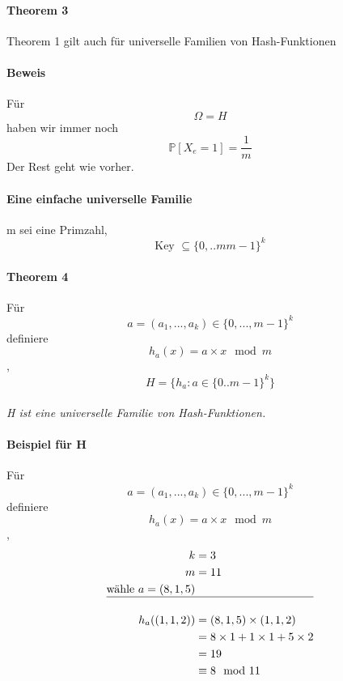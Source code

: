 \documentclass[a4paper]{scrartcl}
\begin{document}
	 	\paragraph{Theorem 3}
	 	Theorem 1 gilt auch für universelle Familien von Hash-Funktionen
	 	
	 	\paragraph{Beweis}
	 	Für \[ \Omega = H \]
	 	haben wir immer noch 
	 	\[ \mathbb{P}[X_e = 1] = \frac{1}{m} \]
	 	Der Rest geht wie vorher.
	 	
	 \paragraph{Eine einfache universelle Familie}
	 m sei eine Primzahl, 
	 \[ \text{Key } \subseteq \{ 0,..m m - 1 \}^k  \]
	 
	 \paragraph{Theorem 4}
	 Für \[ a = (a_1,..., a_k) \in \{0,..., m-1\}^k  \]
	 definiere \[h_a(x) = a \times x \mod m \],
	 \[ H = \{h_a : a \in \{ 0.. m-1 \}^k \} \]\\
	 \emph{H ist eine universelle Familie von Hash-Funktionen.}
	 
	 \paragraph{Beispiel für H}
	 Für \[ a = (a_1,..., a_k) \in \{0,..., m-1\}^k  \]
	 definiere \[h_a(x) = a \times x \mod m \],
	 \begin{align*}
	 	k &= 3\\
	 	m &= 11 \\
	 	\text{wähle } a = (8, 1, 5)\\ \hline
	 	\\
	 	h_a ((1, 1, 2)) &= (8, 1, 5) \times (1, 1, 2)\\
	 	&= 8 \times 1 + 1 \times 1+5 \times 2\\
	 	&=19\\
	 	&\equiv 8 \mod 11\\
	 \end{align*}
	 
\end{document}
